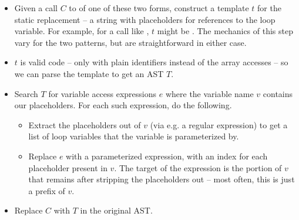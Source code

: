 \begin{itemize}

  \item Given a call $C$ to  of one of these two forms, construct a
    template $t$ for the static replacement -- a string with placeholders for
    references to the loop variable. For example, for a call like
    , $t$ might be
    . The mechanics of this step vary for the two
    patterns, but are straightforward in either case.

  \item $t$ is valid \matlab code -- only with plain identifiers instead
    of the array accesses -- so we can parse the template to get an AST $T$.

  \item Search $T$ for variable access expressions $e$ where the variable name
    $v$ contains our placeholders. For each such expression, do the following.

    \begin{itemize}

      \item Extract the placeholders out of $v$ (via e.g. a regular expression)
        to get a list of loop variables that the variable is parameterized by.

      \item Replace $e$ with a parameterized expression, with an index for each
        placeholder present in $v$. The target of the expression is the portion
        of $v$ that remains after stripping the placeholders out -- most often,
        this is just a prefix of $v$.

    \end{itemize}

  \item Replace $C$ with $T$ in the original AST.

\end{itemize}
